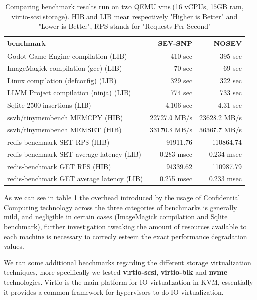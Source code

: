 \documentclass[twocolumn]{article}
\begin{document}
\begin{table}
    \centering
    \label{tab:tinyben-results}
    \begin{tabular}{l|r|r}
    \textbf{benchmark}                        & \textbf{SEV-SNP} & \textbf{NOSEV} \\
    \hline
    Godot Game Engine compilation (LIB)       &  410 sec         & 395 sec        \\
    ImageMagick compilation (gcc) (LIB)       &  70 sec          & 69 sec         \\
    Linux compilation (defconfig) (LIB)       &  329 sec         & 322 sec        \\
    LLVM Project compilation (ninja) (LIB)    &  774 sec         & 733 sec        \\
    Sqlite 2500 insertions (LIB)              &  4.106 sec       & 4.31 sec       \\
    ssvb/tinymembench MEMCPY (HIB)            &  22727.0 MB/s    & 23628.2 MB/s   \\
    ssvb/tinymembench MEMSET (HIB)            &  33170.8 MB/s    & 36367.7 MB/s   \\
    redis-benchmark SET RPS (HIB)             &  91911.76        & 110864.74      \\
    redis-benchmark SET average latency (LIB) &  0.283 msec      & 0.234 msec     \\
    redis-benchmark GET RPS (HIB)             &  94339.62        & 110987.79      \\
    redis-benchmark GET average latency (LIB) &  0.275 msec	     & 0.233 msec     \\
    \end{tabular}
    \caption{Comparing benchmark results run on two QEMU vms (16 vCPUs, 16GB ram, virtio-scsi storage). HIB and LIB mean respectively "Higher is Better" and "Lower is Better", RPS stands for "Requests Per Second"} 
\end{table}

As we can see in table \ref{tab:tinyben-results} the overhead introduced by the usage of Confidential Computing technology across the three categories of benchmarks is generally mild, and negligible in certain cases (ImageMagick compilation and Sqlite benchmark), further investigation tweaking the amount of resources available to each machine is necessary to correcly esteem the exact performance degradation values.

We ran some additional benchmarks regarding the different storage virtualization techniques, more specifically we tested \textbf{virtio-scsi}, 
\textbf{virtio-blk} and \textbf{nvme} technologies. Virtio is the main platform for IO virtualization in KVM, essentially it provides a common framework for hypervisors to do IO virtualization.
\end{document}
